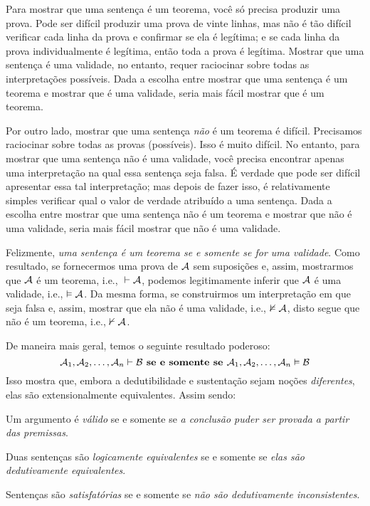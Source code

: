 Para mostrar que uma sentença é um teorema, você só precisa produzir uma prova. Pode ser difícil produzir uma prova de vinte linhas, mas não é tão difícil verificar cada linha da prova e confirmar se ela é legítima; e se cada linha da prova individualmente é legítima, então toda a prova é legítima. Mostrar que uma sentença é uma validade, no entanto, requer raciocinar sobre todas as interpretações possíveis. Dada a escolha entre mostrar que uma sentença é um teorema e mostrar que é uma validade, seria mais fácil mostrar que é um teorema.

Por outro lado, mostrar que uma sentença \emph{não} é um teorema é difícil. Precisamos raciocinar sobre todas as provas (possíveis). Isso é muito difícil. No entanto, para mostrar que uma sentença não é uma validade, você precisa encontrar apenas uma interpretação na qual essa sentença seja falsa. É verdade que pode ser difícil apresentar essa tal interpretação; mas depois de fazer isso, é relativamente simples verificar qual o valor de verdade atribuído a uma sentença. Dada a escolha entre mostrar que uma sentença não é um teorema e mostrar que não é uma validade, seria mais fácil mostrar que não é uma validade.

Felizmente, \emph{uma sentença é um teorema se e somente se for uma validade}. Como resultado, se fornecermos uma prova de $\mathcal{A}$ sem suposições e, assim, mostrarmos que $\mathcal{A}$ é um teorema, i.e., ${}\vdash \mathcal{A}$, podemos legitimamente inferir que $\mathcal{A}$ é uma validade, i.e., $\vDash\mathcal{A}$. Da mesma forma, se construirmos um interpretação em que  seja falsa e, assim, mostrar que ela não é uma validade, i.e., $\nvDash \mathcal{A}$, disto  segue que  não é um teorema, i.e.,  $\nvdash \mathcal{A}$.

De maneira mais geral, temos o seguinte resultado poderoso:
$$\mathcal{A}_1, \mathcal{A}_2, \ldots, \mathcal{A}_n \vdash\mathcal{B} \textbf{ se e somente se }\mathcal{A}_1, \mathcal{A}_2, \ldots, \mathcal{A}_n \vDash\mathcal{B}$$
Isso mostra que, embora a dedutibilidade e sustentação sejam noções \emph{diferentes}, elas são extensionalmente equivalentes. Assim sendo:
	\begin{ebullet}
		\item Um argumento é \emph{válido} se e somente se \emph{a conclusão puder ser provada a partir das premissas}.
		\item Duas sentenças são \emph{logicamente equivalentes} se e somente se \emph{elas são dedutivamente equivalentes}.
		\item Sentenças são \emph{satisfatórias} se e somente se  \emph{não são dedutivamente inconsistentes}.
	\end{ebullet}
 
